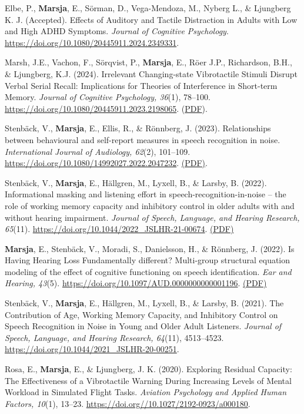 \documentclass[]{article}
\begin{document}
Elbe, P., \textbf{Marsja}, E., Sörman, D., Vega-Mendoza, M., Nyberg L.,
\& Ljungberg K. J. (Accepted). Effects of Auditory and Tactile
Distraction in Adults with Low and High ADHD Symptoms. \emph{Journal of
Cognitive Psychology}.
\href{https://doi.org/10.1080/20445911.2024.2349331.}{https://doi.org/10.1080/20445911.2024.2349331}.

Marsh, J.E., Vachon, F., Sörqvist, P., \textbf{Marsja}, E., Röer J.P.,
Richardson, B.H., \& Ljungberg, K.J. (2024). Irrelevant Changing-state
Vibrotactile Stimuli Disrupt Verbal Serial Recall: Implications for
Theories of Interference in Short-term Memory. \emph{Journal of
Cognitive Psychology, 36}(1), 78--100.
\url{https://doi.org/10.1080/20445911.2023.2198065}.
(\href{https://bit.ly/JoCP23}{PDF}).

Stenbäck, V., \textbf{Marsja}, E., Ellis, R., \& Rönnberg, J. (2023).
Relationships between behavioural and self-report measures in speech
recognition in noise. \emph{International Journal of Audiology, 62}(2),
101--109. \url{https://doi.org/10.1080/14992027.2022.2047232}.
\href{https://bit.ly/IJA2022}{(PDF)}.

Stenbäck, V., \textbf{Marsja}, E., Hällgren, M., Lyxell, B., \& Larsby,
B. (2022). Informational masking and listening effort in
speech-recognition-in-noise -- the role of working memory capacity and
inhibitory control in older adults with and without hearing impairment.
\emph{Journal of Speech, Language, and Hearing Research, 65}(11).
\url{https://doi.org/10.1044/2022_JSLHR-21-00674}.
\href{https://bit.ly/JSLHR22b}{(PDF)}

\textbf{Marsja}, E., Stenbäck, V., Moradi, S., Danielsson, H., \&
Rönnberg, J. (2022). Is Having Hearing Loss Fundamentally different?
Multi-group structural equation modeling of the effect of cognitive
functioning on speech identification. \emph{Ear and Hearing, 43}(5).
\url{https://doi.org/10.1097/AUD.0000000000001196}.
\href{https://bit.ly/EANDH22}{(PDF)}

Stenbäck, V., \textbf{Marsja}, E., Hällgren, M., Lyxell, B., \& Larsby,
B. (2021). The Contribution of Age, Working Memory Capacity, and
Inhibitory Control on Speech Recognition in Noise in Young and Older
Adult Listeners. \emph{Journal of Speech, Language, and Hearing
Research, 64}(11), 4513--4523.
\url{https://doi.org/10.1044/2021_JSLHR-20-00251}.

Rosa, E., \textbf{Marsja}, E., \& Ljungberg, J. K. (2020). Exploring
Residual Capacity: The Effectiveness of a Vibrotactile Warning During
Increasing Levels of Mental Workload in Simulated Flight Tasks.
\emph{Aviation Psychology and Applied Human Factors, 10}(1), 13--23.
\url{https://doi.org//10.1027/2192-0923/a000180}.
\end{document}
